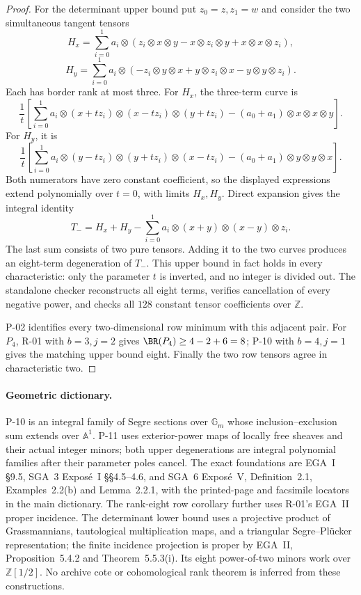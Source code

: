 \begin{proof}
For the determinant upper bound put $z_0=z,z_1=w$ and
consider the two simultaneous tangent tensors
\[
 H_x=\sum_{i=0}^1a_i\otimes
 (z_i\otimes x\otimes y-x\otimes z_i\otimes y
                         +x\otimes x\otimes z_i),
\]
\[
 H_y=\sum_{i=0}^1a_i\otimes
 (-z_i\otimes y\otimes x+y\otimes z_i\otimes x
                         -y\otimes y\otimes z_i).
\]
Each has border rank at most three. For $H_x$, the
three-term curve is
\[
 \frac{1}{t}\left[
 \sum_{i=0}^1a_i\otimes(x+tz_i)\otimes(x-tz_i)\otimes(y+tz_i)
 -(a_0+a_1)\otimes x\otimes x\otimes y\right].
\]
For $H_y$, it is
\[
 \frac{1}{t}\left[
 \sum_{i=0}^1a_i\otimes(y-tz_i)\otimes(y+tz_i)\otimes(x-tz_i)
 -(a_0+a_1)\otimes y\otimes y\otimes x\right].
\]
Both numerators have zero constant coefficient, so
the displayed expressions extend polynomially over
$t=0$, with limits $H_x,H_y$. Direct expansion gives
the integral identity
\[
 T_-=H_x+H_y-
       \sum_{i=0}^1a_i\otimes(x+y)\otimes(x-y)\otimes z_i.
\]
The last sum consists of two pure tensors. Adding it
to the two curves produces an eight-term degeneration
of $T_-$. This upper bound in fact holds in every
characteristic: only the parameter $t$ is inverted,
and no integer is divided out. The standalone checker
reconstructs all eight terms, verifies cancellation of
every negative power, and checks all $128$ constant
tensor coefficients over $\mathbb Z$.

P-02 identifies every two-dimensional row minimum with
this adjacent pair. For $P_4$, R-01 with $b=3,j=2$
gives $\BR(P_4)\geq4-2+6=8$; P-10 with $b=4,j=1$
gives the matching upper bound eight. Finally the two
row tensors agree in characteristic two.
\end{proof}

\paragraph{Geometric dictionary.}
P-10 is an integral family of Segre sections over
$\mathbb G_m$ whose inclusion--exclusion sum extends
over $\mathbb A^1$. P-11 uses exterior-power maps of
locally free sheaves and their actual integer minors;
both upper degenerations are integral polynomial
families after their parameter poles cancel. The exact
foundations are EGA~I \S9.5,
SGA~3 Expos\'e~I \S\S4.5--4.6, and SGA~6 Expos\'e~V,
Definition~2.1, Examples~2.2(b) and Lemma~2.2.1, with
the printed-page and facsimile locators in the main
dictionary. The rank-eight row corollary further uses
R-01's EGA~II proper incidence. The determinant lower
bound uses a projective product of Grassmannians,
tautological multiplication maps, and a triangular
Segre--Pl\"ucker representation; the finite incidence
projection is proper by EGA~II, Proposition~5.4.2 and
Theorem~5.5.3(i). Its eight power-of-two minors work
over $\mathbb Z[1/2]$. No archive cote or
cohomological rank theorem is inferred from these
constructions.
